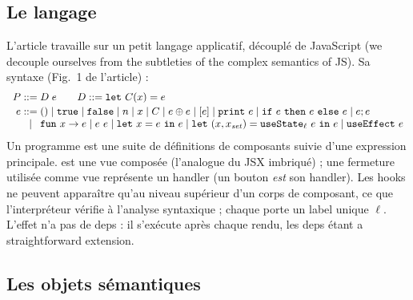 \subsection{Le langage}

L'article travaille sur un petit langage applicatif, découplé de JavaScript
(\og we decouple ourselves from the subtleties of the complex semantics of
JS\fg{}). Sa syntaxe (Fig.~1 de l'article) :
\[
\begin{array}{r@{\;}c@{\;}l}
  P &::=& D\;e \qquad D ::= \mathtt{let}\ C(x) = e\\[2pt]
  e &::=& () \mid \mathtt{true} \mid \mathtt{false} \mid n \mid x \mid C
          \mid e \oplus e \mid [e] \mid \mathtt{print}\ e
          \mid \mathtt{if}\ e\ \mathtt{then}\ e\ \mathtt{else}\ e \mid e;e\\
    &\mid& \mathtt{fun}\ x \to e \mid e\ e \mid \mathtt{let}\ x = e\ \mathtt{in}\ e
     \mid \mathtt{let}\ (x, x_{\mathit{set}}) = \mathtt{useState}_\ell\ e\ \mathtt{in}\ e
     \mid \mathtt{useEffect}\ e
\end{array}
\]
Un programme est une suite de définitions de composants suivie d'une
expression principale. \code{[e]} est une vue composée (l'analogue du JSX
imbriqué) ; une fermeture utilisée comme vue représente un handler (un bouton
\emph{est} son handler). Les hooks ne peuvent apparaître qu'au niveau supérieur
d'un corps de composant, ce que l'interpréteur vérifie à l'analyse syntaxique ;
chaque  porte un label unique $\ell$. L'effet n'a pas de deps :
il s'exécute après chaque rendu, les deps étant \og a straightforward
extension\fg{}.

\subsection{Les objets sémantiques}

